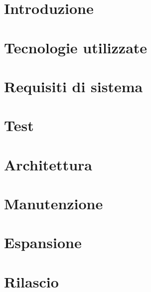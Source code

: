 \documentclass[]{article}
\begin{document}
	
	\newpage
	\tableofcontents
	\newpage
	\listoffigures
	\newpage


	\section{Introduzione}
	
	\newpage

	\section{Tecnologie utilizzate}
	
	\newpage

	\section{Requisiti di sistema}
	
	\newpage

	\section{Test}
	
	\newpage

	\section{Architettura}
	
	\newpage

	\section{Manutenzione}
	
	\newpage
	
	\section{Espansione}
	
	\newpage
	
	\section{Rilascio}
	
	\newpage
	
\end{document}
